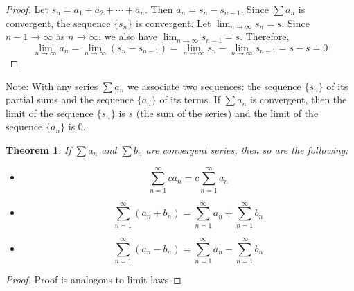 \documentclass[10pt]{report}
\newtheorem{thm2}{Theorem}[section]
\begin{document}
\begin{proof}
Let $s_n = a_1 + a_2 + \cdots + a_n$. Then $a_n = s_n - s_{n-1}$. Since $\sum a_n$ is convergent, the sequence $\{s_n\}$ is convergent. Let $\lim_{n\to \infty}s_n = s$. Since $n-1\to \infty$ as $n\to \infty$, we also have $\lim_{n\to \infty}s_{n-1}=s.$ Therefore,
$$\lim_{n\to \infty}a_n = \lim_{n\to \infty} (s_n-s_{n-1}) = \lim_{n\to\infty}s_n - \lim_{n\to \infty} s_{n-1} = s - s =0$$
\end{proof}
Note: With any series $\sum a_n$ we associate two sequences: the sequence $\{s_n\}$ of its partial sums and the sequence $\{a_n\}$ of its terms. If $\sum a_n$ is convergent, then the limit of the sequence $\{s_n\}$ is $s$ (the sum of the series) and the limit of the sequence $\{a_n\}$ is 0.
\begin{thm2}
If $\sum a_n$ and $\sum b_n$ are convergent series, then so are the following:
\begin{itemize}
\item[(i)] $$\sum_{n=1}^\infty ca_n = c\sum_{n=1}^\infty a_n$$
\item[(ii)] $$\sum_{n=1}^\infty (a_n + b_n)= \sum_{n=1}^\infty a_n + \sum_{n=1}^\infty b_n$$
\item[(iii)] $$\sum_{n=1}^\infty (a_n - b_n)= \sum_{n=1}^\infty a_n - \sum_{n=1}^\infty b_n$$
\end{itemize}
\end{thm2}
\begin{proof}
Proof is analogous to limit laws
\end{proof}
\end{document}
